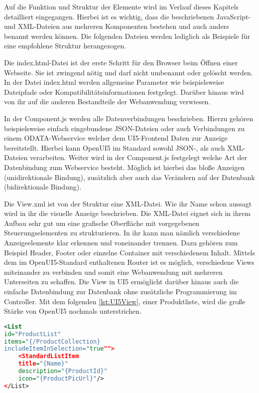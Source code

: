Auf die Funktion und Struktur der Elemente wird im Verlauf dieses Kapitels detailliert eingegangen. Hierbei ist es wichtig, dass die beschriebenen JavaScript- und XML-Dateien aus mehreren Komponenten bestehen und auch anders benannt werden können. Die folgenden Dateien werden lediglich als Beispiele für eine empfohlene Struktur herangezogen. 

Die index.html-Datei ist der erste Schritt für den Browser beim Öffnen einer Webseite. Sie ist zwingend nötig und darf nicht umbenannt oder gelöscht werden. In der Datei index.html werden allgemeine Parameter wie beispielsweise Dateipfade oder Kompatibilitätsinformationen festgelegt. Darüber hinaus wird von ihr auf die anderen Bestandteile der Webanwendung verwiesen.

In der Component.js werden alle Datenverbindungen beschrieben. Hierzu gehören beispielsweise einfach eingebundene JSON-Dateien oder auch Verbindungen zu einem ODATA-Webservice welcher dem UI5-Frontend Daten zur Anzeige bereitstellt. Hierbei kann OpenUI5 im Standard sowohl JSON-, als auch XML-Dateien verarbeiten. Weiter wird in der Component.js festgelegt welche Art der Datenbindung zum Webservice besteht. Möglich ist hierbei das bloße Anzeigen (unidirektionale Bindung), zusätzlich aber auch das Verändern auf der Datenbank (bidirektionale Bindung).

Die View.xml ist von der Struktur eine XML-Datei. Wie ihr Name schon aussagt wird in ihr die visuelle Anzeige beschrieben. Die XML-Datei eignet sich in ihrem Aufbau sehr gut um eine grafische Oberfläche mit vorgegebenen Steuerungselementen zu strukturieren. In ihr kann man nämlich verschiedene Anzeigeelemente klar erkennen und voneinander trennen. Dazu gehören zum Beispiel Header, Footer oder einzelne Container mit verschiedenem Inhalt. Mittels dem im OpenUI5-Standard enthaltenen Router ist es möglich, verschiedene Views miteinander zu verbinden und somit eine Webanwendung mit mehreren Unterseiten zu schaffen. Die View in UI5 ermöglicht darüber hinaus auch die einfache Datenbindung zur Datenbank ohne zusätzliche Programmierung im Controller. Mit dem folgenden \autoref{lst:UI5View}, einer Produktliste, wird die große Stärke von OpenUI5 nochmals unterstrichen.

\begin{lstlisting}[caption=Beispiel OpenUI5 View, label=lst:UI5View, language=XML]
<List
id="ProductList"
items="{/ProductCollection}
includeItemInSelection="true"">
	<StandardListItem
	title="{Name}"
	description="{ProductId}"
	icon="{ProductPicUrl}"/>
</List>
\end{lstlisting}

